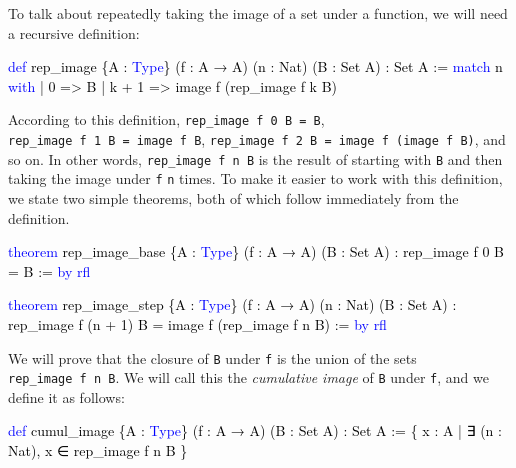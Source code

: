 \documentclass[
  letterpaper,
  DIV=11,
  numbers=noendperiod]{scrreprt}
\newenvironment{Shaded}{\begin{snugshade}}{\end{snugshade}}
\newcommand{\KeywordTok}[1]{\textcolor[rgb]{0.00,0.23,0.31}{#1}}
\newcommand{\NormalTok}[1]{\textcolor[rgb]{0.00,0.23,0.31}{#1}}
\renewcommand{\NormalTok}[1]{\textcolor[HTML]{000000}{#1}}
\renewcommand{\KeywordTok}[1]{\textcolor[HTML]{0000FF}{#1}}
\theoremstyle{remark}
\begin{document}
To talk about repeatedly taking the image of a set under a function, we
will need a recursive definition:

\begin{Shaded}
\begin{Highlighting}[]
\KeywordTok{def}\NormalTok{ rep\_image \{A : }\KeywordTok{Type}\NormalTok{\} (f : A → A) (n : Nat) (B : Set A) : Set A :=}
  \KeywordTok{match}\NormalTok{ n }\KeywordTok{with}
\NormalTok{    | 0 =\textgreater{} B}
\NormalTok{    | k + 1 =\textgreater{} image f (rep\_image f k B)}
\end{Highlighting}
\end{Shaded}

According to this definition, \texttt{rep\_image\ f\ 0\ B\ =\ B},
\texttt{rep\_image\ f\ 1\ B\ =\ image\ f\ B},
\texttt{rep\_image\ f\ 2\ B\ =\ image\ f\ (image\ f\ B)}, and so on. In
other words, \texttt{rep\_image\ f\ n\ B} is the result of starting with
\texttt{B} and then taking the image under \texttt{f} \texttt{n} times.
To make it easier to work with this definition, we state two simple
theorems, both of which follow immediately from the definition.

\begin{Shaded}
\begin{Highlighting}[]
\KeywordTok{theorem}\NormalTok{ rep\_image\_base \{A : }\KeywordTok{Type}\NormalTok{\} (f : A → A) (B : Set A) :}
\NormalTok{    rep\_image f 0 B = B := }\KeywordTok{by} \KeywordTok{rfl}

\KeywordTok{theorem}\NormalTok{ rep\_image\_step \{A : }\KeywordTok{Type}\NormalTok{\} (f : A → A) (n : Nat) (B : Set A) :}
\NormalTok{    rep\_image f (n + 1) B = image f (rep\_image f n B) := }\KeywordTok{by} \KeywordTok{rfl}
\end{Highlighting}
\end{Shaded}

We will prove that the closure of \texttt{B} under \texttt{f} is the
union of the sets \texttt{rep\_image\ f\ n\ B}. We will call this the
\emph{cumulative image} of \texttt{B} under \texttt{f}, and we define it
as follows:

\begin{Shaded}
\begin{Highlighting}[]
\KeywordTok{def}\NormalTok{ cumul\_image \{A : }\KeywordTok{Type}\NormalTok{\} (f : A → A) (B : Set A) : Set A :=}
\NormalTok{  \{ x : A | ∃ (n : Nat), x ∈ rep\_image f n B \}}
\end{Highlighting}
\end{Shaded}
\end{document}
